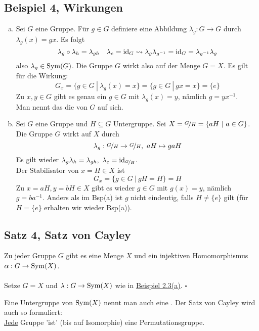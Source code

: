 \subsection{Beispiel 4, Wirkungen}
\label{sub:bsp_wirkungen}
\begin{enumerate}[(a)]
	\item Sei $G$ eine Gruppe. 
	Für $g\in G$ definiere eine Abbildung $\lambda_g:G\to G$ durch $\lambda_g(x)=gx$. 
	Es folgt
	\[
	\lambda_g\circ\lambda_h=\lambda_{gh} \quad \lambda_e=\operatorname{id}_G \rightsquigarrow \lambda_g\lambda_{g^{-1}}=\operatorname{id}_G=\lambda_{g^{-1}}\lambda_g 
	\]
	also $\lambda_g\in \operatorname{Sym}(G)$. 
	Die Gruppe $G$ wirkt also auf der Menge $G=X$. 
	Es gilt für die Wirkung:
	\[
	G_x=\{g\in G~|~\lambda_g(x)=x \}=\{g\in G~|~gx=x \}=\{e\} 
	\]
	Zu $x,y\in G$ gibt es genau ein $g\in G$ mit $\lambda_g(x)=y$, nämlich $g=yx^{-1}$.\\
	Man nennt das die  von $G$ auf sich.
	\item Sei $G$ eine Gruppe und $H\subseteq G$ Untergruppe. 
	Sei $X=\nicefrac{G}{H}=\{aH~|~a\in G \}$. 
	Die Gruppe $G$ wirkt auf $X$ durch 
	\[
	\lambda_g:\nicefrac{G}{H}\to \nicefrac{G}{H},~aH\mapsto gaH 
	\]
	Es gilt wieder $\lambda_g\lambda_h=\lambda_{gh},~\lambda_e=\operatorname{id}_{\nicefrac{G}{H}}$.\\
	Der Stabilisator von $x=H\in X$ ist 
	\[
	G_x=\{g\in G~|~gH=H \}=H 
	\]
	Zu $x=aH,y=bH\in X$ gibt es wieder $g\in G$ mit $g(x)=y$, nämlich $g=ba^{-1}$. 
	Anders als im Bsp(a) ist $g$ nicht eindeutig, falls $H\not= \{e\}$ gilt (für $H=\{e\}$ erhalten wir wieder Bsp(a)). 
\end{enumerate}

\subsection{Satz 4, Satz von Cayley}
\label{sub:satz_von_cayley}
Zu jeder Gruppe $G$ gibt es eine Menge $X$ und ein injektiven Homomorphismus $\alpha:G\to \operatorname{Sym}(X)$.\\

\\
Setze $G=X$ und $\lambda:G\to \operatorname{Sym}(X)$ wie in \hyperref[sub:bsp_wirkungen]{Beispiel 2.3(a)}.
\hfill $\square$

Eine Untergruppe von $\operatorname{Sym}(X)$ nennt man auch eine . 
Der Satz von Cayley wird auch so formuliert:\\
\uline{Jede} Gruppe 'ist' (bis auf Isomorphie) eine Permutationsgruppe.

